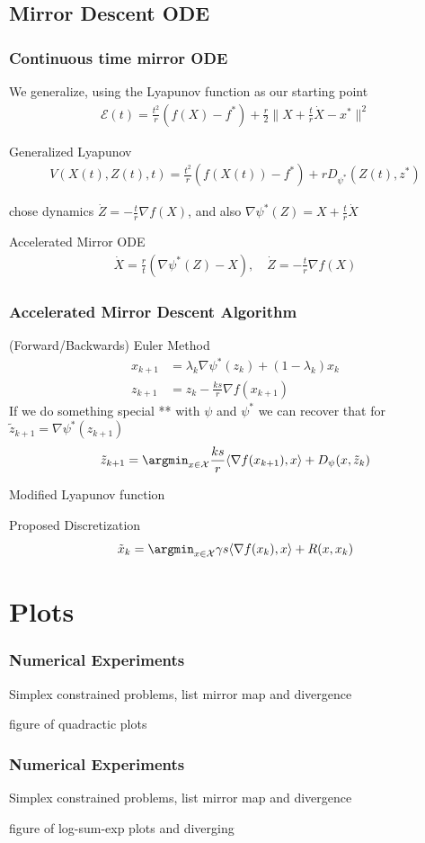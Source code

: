 \documentclass{beamer}
\begin{document}
\subsection{Mirror Descent ODE}
\begin{frame}
\frametitle{Continuous time mirror ODE}
We generalize, using the Lyapunov function as our starting point
\begin{align*}
\mathcal{E}(t) = \frac{t^2}{r} (f(X) - f^*) + \frac{r}{2} \|X+\frac{t}{r}\dot X - x^* \|^2
\end{align*}
\begin{block}{Generalized Lyapunov}
\begin{align*}
V(X(t),Z(t),t) = \frac{t^2}{r} (f(X(t)) - f^*) + r D_{\psi^*} (Z(t), z^*) 
\end{align*}
\end{block}
chose dynamics $\dot Z = -\frac{t}{r} \nabla f(X)$, and also $\nabla \psi^*(Z) = X + \frac{t}{r} \dot X$ 
\begin{block}{Accelerated Mirror ODE}
\begin{align*}
\dot X = \frac{r}{t} (\nabla \psi^*(Z) - X),\quad \dot Z = -\frac{t}{r} \nabla f(X)
\end{align*}
\end{block}
\end{frame}

\begin{frame}
\frametitle{Accelerated Mirror Descent Algorithm}
\begin{block}{(Forward/Backwards) Euler Method}
\begin{align*} x_{k+1}  &= \lambda_k \nabla \psi^*(z_k) + (1-\lambda_k) x_{k}\\
z_{k+1}& = z_k -\frac{ks}{r} \nabla f(x_{k+1}) 
\end{align*}
If we do something special ** with $\psi$ and $\psi^*$ we can recover that for $\tilde z_{k+1} = \nabla \psi^*(z_{k+1} )$
\[\tilde z_{k+1} = \argmin_{x\in\mathcal{X}} \frac{ks}{r} \langle \nabla f(x_{k+1}), x \rangle + D_\psi (x, \tilde z_k)\]
\end{block}
Modified Lyapunov function
\begin{block}{Proposed Discretization}
\[\tilde x_k = \argmin_{x\in\mathcal X} \gamma s \langle \nabla f(x_k), x \rangle + R(x,x_k) \]
\end{block}
\end{frame}

\section{Plots}
\begin{frame}
\frametitle{Numerical Experiments}
Simplex constrained problems, list mirror map and divergence

figure of quadractic plots
\end{frame}

\begin{frame}
\frametitle{Numerical Experiments}
Simplex constrained problems, list mirror map and divergence

figure of log-sum-exp plots and diverging
\end{frame}
\end{document}
